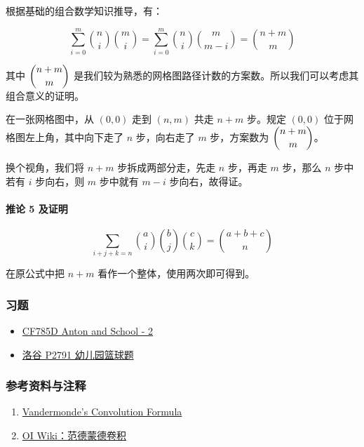 根据基础的组合数学知识推导，有：

$$
\sum_{i=0}^m\binom{n}{i}\binom{m}{i}=\sum_{i=0}^m\binom{n}{i}\binom{m}{m-i}=\binom{n+m}{m}
$$

其中 $\dbinom{n+m}{m}$ 是我们较为熟悉的网格图路径计数的方案数。所以我们可以考虑其组合意义的证明。

在一张网格图中，从 $(0,0)$ 走到 $(n,m)$ 共走 $n+m$ 步。规定 $(0,0)$ 位于网格图左上角，其中向下走了 $n$ 步，向右走了 $m$ 步，方案数为 $\dbinom{n+m}{m}$。

换个视角，我们将 $n+m$ 步拆成两部分走，先走 $n$ 步，再走 $m$ 步，那么 $n$ 步中若有 $i$ 步向右，则 $m$ 步中就有 $m-i$ 步向右，故得证。

\paragraph{推论 5 及证明}
$$
\sum_{i+j+k=n}\binom{a}{i}\binom{b}{j}\binom{c}{k}=\binom{a+b+c}{n}
$$

在原公式中把 $n+m$ 看作一个整体，使用两次即可得到。

\hrulefill

\subsubsection*{习题}

\begin{itemize}
    \item \href{https://codeforces.com/problemset/problem/785/D}{CF785D Anton and School - 2}
    \item \href{https://www.luogu.com.cn/problem/P2791}{洛谷 P2791 幼儿园篮球题}
\end{itemize}

\hrulefill

\subsubsection*{参考资料与注释}

\begin{enumerate}
    \item \href{https://www.cut-the-knot.org/arithmetic/algebra/VandermondeConvolution.shtml}{Vandermonde's Convolution Formula}
    \item \href{https://oi-wiki.org/math/combinatorics/vandermonde-convolution/}{OI Wiki：范德蒙德卷积}
\end{enumerate}
